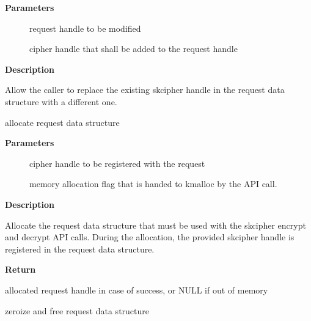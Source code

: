 \documentclass[a4paper,8pt,english]{sphinxmanual}
\begin{document}
\textbf{Parameters}
\begin{description}
\item[{}] \leavevmode
request handle to be modified

\item[{}] \leavevmode
cipher handle that shall be added to the request handle

\end{description}

\textbf{Description}

Allow the caller to replace the existing skcipher handle in the request
data structure with a different one.

\begin{fulllineitems}
\label{crypto/api-skcipher:c.skcipher_request_alloc}
allocate request data structure

\end{fulllineitems}


\textbf{Parameters}
\begin{description}
\item[{}] \leavevmode
cipher handle to be registered with the request

\item[{}] \leavevmode
memory allocation flag that is handed to kmalloc by the API call.

\end{description}

\textbf{Description}

Allocate the request data structure that must be used with the skcipher
encrypt and decrypt API calls. During the allocation, the provided skcipher
handle is registered in the request data structure.

\textbf{Return}

allocated request handle in case of success, or NULL if out of memory

\begin{fulllineitems}
\label{crypto/api-skcipher:c.skcipher_request_free}
zeroize and free request data structure

\end{fulllineitems}
\end{document}
